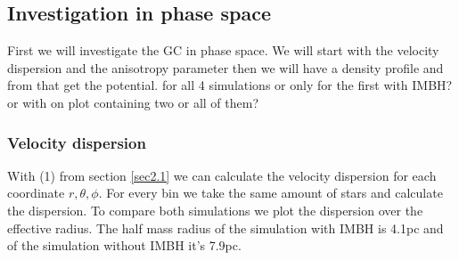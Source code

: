 \documentclass[a4paper,12pt,abstracton]{scrartcl}
\begin{document}
\subsection{Investigation in phase space}
First we will investigate the \ac{GC} in phase space. We will start with the velocity dispersion and the anisotropy parameter then we will have a density profile and from that get the potential. \color{red} for all 4 simulations or only for the first with IMBH? or with on plot containing two or all of them? \color{black}

\subsubsection{Velocity dispersion}
With (1) from section \ref{sec2.1} we can calculate the velocity dispersion for each coordinate \(r,\theta,\phi\). For every bin we take the same amount of stars and calculate the dispersion. To compare both simulations we plot the dispersion over the effective radius. The half mass radius of the simulation with \ac{IMBH} is 4.1pc and of the simulation without \ac{IMBH} it's 7.9pc. 
\end{document}
